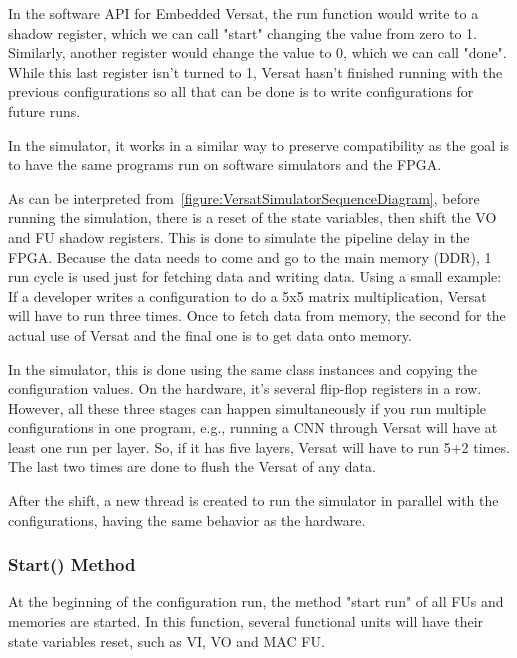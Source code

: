 \documentclass[conference]{IEEEtran}
\begin{document}
In the software API for Embedded Versat, the run function would write to a shadow register,
which we can call "start" changing the value from zero to 1. 
Similarly, another register would
change the value to 0, which we can call "done". While this last register isn't turned to 1, 
Versat hasn't finished running with the 
previous configurations so all that can be done is to write
configurations for future runs.

In the simulator, it works in a similar way to preserve compatibility 
as the goal is to have the same
programs run on software simulators and the FPGA.

% 

As can be interpreted from~\ref{figure:VersatSimulatorSequenceDiagram}, before running the simulation, there is a reset of the state variables, then shift the 
VO and FU shadow registers.
This is done to simulate the pipeline delay in the FPGA. 
Because the data needs to come and go to the main memory (DDR),
1 run cycle is used just for fetching data and writing data. 
Using a small example:
If a developer writes a configuration to do a 5x5 matrix multiplication, 
Versat will have to run three times.
Once to fetch data from memory, the second for the actual use of Versat 
and the final one is to get data onto memory.

In the simulator, this is done using the same class instances and 
copying the configuration values. On the hardware, it's several flip-flop registers in a row.
However, all these three stages can happen simultaneously if you run multiple configurations in one program, 
e.g., running a CNN
through Versat will have at least one run per layer. 
So, if it has five layers, Versat will have to run 5+2 times. The last two times are done to
flush the Versat of any data.

After the shift, a new thread is created to run the simulator in parallel with the configurations, having the same behavior as the hardware.

\subsubsection{Start() Method}

At the beginning of the configuration run, the method "start run" of all FUs and memories are started.
In this function, several functional units will have their state variables reset, such as VI, VO and MAC FU.
\end{document}
